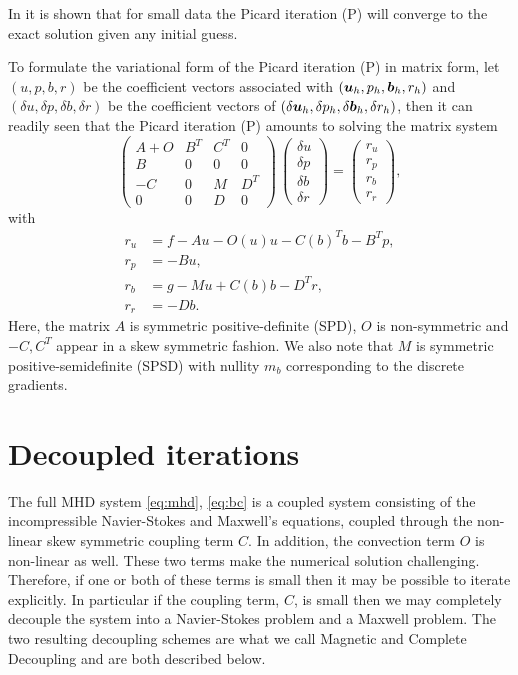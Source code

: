 In \cite{schotzau2004mixed} it is shown that for small data the Picard iteration (P) will converge to the exact solution given any initial guess.

To formulate the variational form of the Picard iteration (P) in matrix form, let $({u},p,{b},r)$ be the coefficient vectors associated with $(\boldsymbol u_h,p_h,\boldsymbol b_h,r_h)$ and $(\delta{u},\delta p,\delta{b},\delta r)$ be the coefficient vectors of $(\delta \boldsymbol u_h,\delta p_h,\delta \boldsymbol b_h,\delta r_h)$, then it can readily seen that the Picard iteration (P) amounts to solving the matrix system
\begin{equation}
\label{eq:mhd_saddle}
\left(
\begin{array}{cccc}
A+O & B^T & C^T & 0\\
B & 0 & 0 & 0 \\
-C & 0 & M & D^T\\
0 & 0 & D & 0
\end{array}
\right)
\,
\left(
\begin{array}{c}
\delta u\\
\delta p\\
\delta b\\
\delta r
\end{array}
\right)  =
\begin{pmatrix}
r_u \\
r_p\\
r_b\\
r_r
\end{pmatrix},
\end{equation}
with
\begin{align*}
r_u &= f- Au -O(u) u - C(b)^T b- B^T p,\\[0.1cm]
r_p &=-B u,\\[0.1cm]
r_b &=g-Mu+C(b)b-D^T r,\\[0.1cm]
r_r &=-D b.
\end{align*}
Here, the matrix $A$  is symmetric positive-definite (SPD), $O$ is non-symmetric and $-C,C^T$ appear in a skew symmetric fashion. We also note that $M$ is symmetric positive-semidefinite (SPSD) with nullity $m_b$ corresponding to the discrete gradients.


\section{Decoupled iterations}
\label{sec:FEMdecouple}


The full MHD system \eqref{eq:mhd}, \eqref{eq:bc} is a coupled system consisting of the incompressible Navier-Stokes and Maxwell's equations, coupled through the non-linear skew symmetric coupling term $C$. In addition, the convection term $O$ is non-linear as well. These two terms make the numerical solution challenging. Therefore, if one or both of these terms is small then it may be possible to iterate explicitly. In particular if the coupling term, $C$, is small then we may completely decouple the system into a Navier-Stokes problem and a Maxwell problem. The two resulting decoupling schemes are what we call Magnetic and Complete Decoupling and are both described below.


